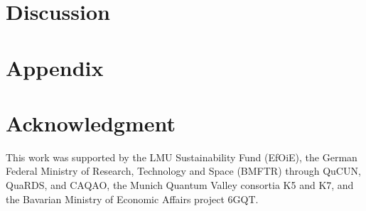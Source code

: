 \documentclass[conference]{IEEEtran}
\newif\ifanonymouspaper
\begin{document}
\section{Discussion}
\label{sec:discussion}


\section*{Appendix}


\ifanonymouspaper\else
\section*{Acknowledgment}
This work was supported by the LMU Sustainability Fund (EfOiE), the German
Federal Ministry of Research, Technology and Space (BMFTR) through QuCUN,
QuaRDS, and CAQAO, the Munich Quantum Valley consortia K5 and K7, and the
Bavarian Ministry of Economic Affairs project 6GQT.
\fi



\end{document}
